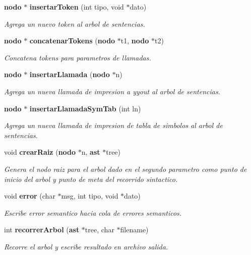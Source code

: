 \begin{CompactItemize}
{\bf nodo} $\ast$ {\bf insertar\-Token} (int tipo, void $\ast$dato)
\begin{CompactList}\small\item\em Agrega un nuevo token al arbol de sentencias. \item\end{CompactList}\item 
{\bf nodo} $\ast$ {\bf concatenar\-Tokens} ({\bf nodo} $\ast$t1, {\bf nodo} $\ast$t2)
\begin{CompactList}\small\item\em Concatena tokens para parametros de llamadas. \item\end{CompactList}\item 
{\bf nodo} $\ast$ {\bf insertar\-Llamada} ({\bf nodo} $\ast$n)
\begin{CompactList}\small\item\em Agrega un nueva llamada de impresion a yyout al arbol de sentencias. \item\end{CompactList}\item 
{\bf nodo} $\ast$ {\bf insertar\-Llamada\-Sym\-Tab} (int ln)
\begin{CompactList}\small\item\em Agrega un nueva llamada de impresion de tabla de simbolos al arbol de sentencias. \item\end{CompactList}\item 
void {\bf crear\-Raiz} ({\bf nodo} $\ast$n, {\bf ast} $\ast$tree)
\begin{CompactList}\small\item\em Genera el nodo raiz para el arbol dado en el segundo parametro como punto de inicio del arbol y punto de meta del recorrido sintactico. \item\end{CompactList}\item 
void {\bf error} (char $\ast$msg, int tipo, void $\ast$dato)
\begin{CompactList}\small\item\em Escribe error semantico hacia cola de errores semanticos. \item\end{CompactList}\item 
int {\bf recorrer\-Arbol} ({\bf ast} $\ast$tree, char $\ast$filename)
\begin{CompactList}\small\item\em Recorre el arbol y escribe resultado en archivo salida. \item\end{CompactList}\item 

\end{CompactItemize}
